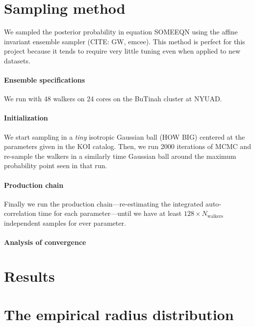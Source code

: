 \documentclass[12pt,preprint]{aastex}
\begin{document}
\section{Sampling method}

We sampled the posterior probability in equation SOMEEQN using the affine
invariant ensemble sampler (CITE: GW, emcee).
This method is perfect for this project because it tends to require very
little tuning even when applied to new datasets.

\paragraph{Ensemble specifications}
We run with 48 walkers on 24 cores on the BuTinah cluster at NYUAD.

\paragraph{Initialization}
We start sampling in a \emph{tiny} isotropic Gaussian ball (HOW BIG) centered
at the parameters given in the KOI catalog.
Then, we run 2000 iterations of MCMC and re-sample the walkers in a similarly
time Gaussian ball around the maximum probability point seen in that run.

\paragraph{Production chain}
Finally we run the production chain---re-estimating the integrated
auto-correlation time for each parameter---until we have at least $128 \times
N_\mathrm{walkers}$ independent samples for ever parameter.

\paragraph{Analysis of convergence}


\section{Results}


\section{The empirical radius distribution}
\end{document}
